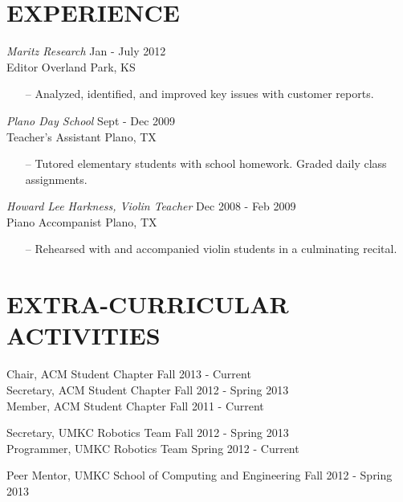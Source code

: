 \documentclass[line,margin]{res}
\begin{document}
\begin{resume}
\section{EXPERIENCE} 
		
		{\it Maritz Research } \hfill            Jan - July 2012\\
		Editor 		\hfill Overland Park, KS
                 \begin{itemize} [leftmargin=5mm]  \itemsep -2pt %
                 \item[--]  Analyzed, identified, and improved  key issues with customer reports.
                 \end{itemize} 
                {\it Plano Day School} \hfill        Sept - Dec  2009\\
        	Teacher's Assistant \hfill Plano, TX 
		\begin{itemize} [leftmargin=5mm] 
                   \item [--] Tutored elementary students with school homework. Graded daily class assignments. 
                   \end{itemize} 

              {\it Howard Lee Harkness, Violin Teacher} \hfill        Dec 2008 - Feb 2009\\
        	Piano Accompanist \hfill Plano, TX 
		\begin{itemize} [leftmargin=5mm] 
                   \item [--] Rehearsed with and accompanied violin students in a culminating recital. 
                   \end{itemize} 
	
\section{EXTRA-CURRICULAR \\ ACTIVITIES}             
		Chair, ACM Student Chapter \hfill Fall 2013 - Current \\
		Secretary, ACM Student Chapter \hfill Fall 2012 - Spring 2013 \\	
		Member, ACM Student Chapter \hfill Fall 2011 - Current 
		
		Secretary, UMKC Robotics Team \hfill  Fall 2012 - Spring 2013 \\	
		Programmer, UMKC Robotics Team \hfill Spring 2012 - Current 
		
		Peer Mentor, UMKC School of Computing and Engineering \hfill Fall 2012 - Spring 2013 


\end{resume}
\end{document}
